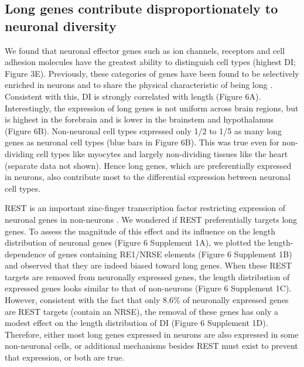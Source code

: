\subsection{Long genes contribute disproportionately to neuronal diversity}

We found that neuronal effector genes such as ion channels, receptors and cell adhesion molecules have the greatest ability to distinguish cell types (highest DI; Figure 3E). Previously, these categories of genes have been found to be selectively enriched in neurons and to share the physical characteristic of being long \citep{Sugino_2014,Gabel_2015,Zylka_2015}. Consistent with this, DI is strongly correlated with length (Figure 6A). Interestingly, the expression of long genes is not uniform across brain regions, but is highest in the forebrain and is lower in the brainstem and hypothalamus (Figure 6B). Non-neuronal cell types expressed only 1/2 to 1/5 as many long genes as neuronal cell types (blue bars in Figure 6B). This was true even for non-dividing cell types like myocytes and largely non-dividing tissues like the heart (separate data not shown). Hence long genes, which are preferentially expressed in neurons, also contribute most to the differential expression between neuronal cell types. 

REST is an important zinc-finger transcription factor restricting expression of neuronal genes in non-neurons \citep{RN1,RN2a}. We wondered if REST preferentially targets long genes. To assess the magnitude of this effect and its influence on the length distribution of neuronal genes (Figure 6 Supplement 1A), we plotted the length-dependence of genes containing RE1/NRSE elements (Figure 6 Supplement 1B) and observed that they are indeed biased toward long genes. When these REST targets are removed from neuronally expressed genes, the length distribution of expressed genes looks similar to that of non-neurons (Figure 6 Supplement 1C). However, consistent with the fact that only 8.6\% of neuronally expressed genes are REST targets (contain an NRSE), the removal of these genes has only a modest effect on the length distribution of DI (Figure 6 Supplement 1D). Therefore, either most long genes expressed in neurons are also expressed in some non-neuronal cells, or additional mechanisms besides REST must exist to prevent that expression, or both are true. 


